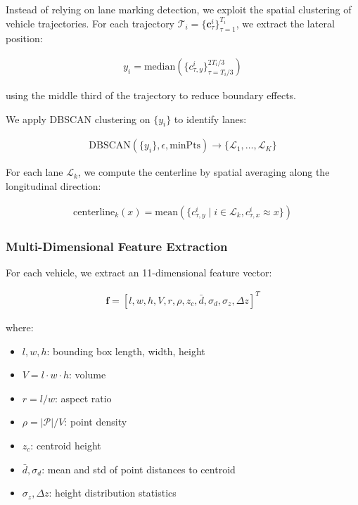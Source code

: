 \documentclass[numbered]{trbunofficial}
\begin{document}
Instead of relying on lane marking detection, we exploit the spatial clustering of vehicle trajectories. For each trajectory $\mathcal{T}_i = \{\mathbf{c}_\tau^i\}_{\tau=1}^{T_i}$, we extract the lateral position:

\begin{align}
  y_i = \text{median}(\{c_{\tau,y}^i\}_{\tau=T_i/3}^{2T_i/3})
\end{align}

using the middle third of the trajectory to reduce boundary effects.

We apply DBSCAN clustering on $\{y_i\}$ to identify lanes:

\begin{align}
  \text{DBSCAN}(\{y_i\}, \epsilon, \text{minPts}) \rightarrow \{\mathcal{L}_1, \ldots, \mathcal{L}_K\}
\end{align}

For each lane $\mathcal{L}_k$, we compute the centerline by spatial averaging along the longitudinal direction:

\begin{align}
  \text{centerline}_k(x) = \text{mean}(\{c_{\tau,y}^i \mid i \in \mathcal{L}_k, c_{\tau,x}^i \approx x\})
\end{align}

\subsubsection{Multi-Dimensional Feature Extraction}

For each vehicle, we extract an 11-dimensional feature vector:

\begin{align}
  \mathbf{f} = [l, w, h, V, r, \rho, z_c, \bar{d}, \sigma_d, \sigma_z, \Delta z]^T
\end{align}

where:
\begin{itemize}
  \item $l, w, h$: bounding box length, width, height
  \item $V = l \cdot w \cdot h$: volume
  \item $r = l/w$: aspect ratio
  \item $\rho = |\mathcal{P}|/V$: point density
  \item $z_c$: centroid height
  \item $\bar{d}, \sigma_d$: mean and std of point distances to centroid
  \item $\sigma_z, \Delta z$: height distribution statistics
\end{itemize}
\end{document}
